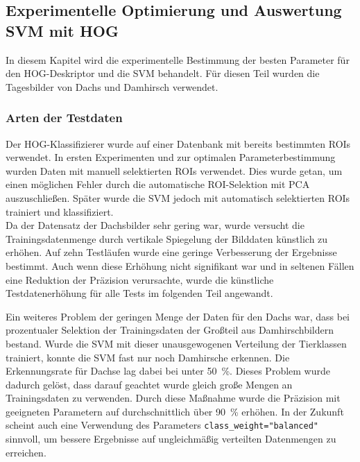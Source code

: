 \subsection{Experimentelle Optimierung und Auswertung SVM mit HOG} \label{sec:HOG_parameter_and_results}
In diesem Kapitel wird die experimentelle Bestimmung der besten Parameter für den HOG-Deskriptor und die SVM behandelt. Für diesen Teil wurden die Tagesbilder von Dachs und Damhirsch verwendet.


\subsubsection{Arten der Testdaten} \label{sssec:test_data_HOG}
Der HOG-Klassifizierer wurde auf einer Datenbank mit bereits bestimmten ROIs verwendet. In ersten Experimenten und zur optimalen Parameterbestimmung wurden Daten mit manuell selektierten ROIs verwendet. Dies wurde getan, um einen möglichen Fehler durch die automatische ROI-Selektion mit PCA auszuschließen. Später wurde die SVM jedoch mit automatisch selektierten ROIs trainiert und klassifiziert.\\ 
Da der Datensatz der Dachsbilder sehr gering war, wurde versucht die Trainingsdatenmenge durch vertikale Spiegelung der Bilddaten künstlich zu erhöhen. Auf zehn Testläufen wurde eine geringe Verbesserung der Ergebnisse bestimmt. Auch wenn diese Erhöhung nicht signifikant war und in seltenen Fällen eine Reduktion der Präzision verursachte, wurde die künstliche Testdatenerhöhung für alle Tests im folgenden Teil angewandt. 

Ein weiteres Problem der geringen Menge der Daten für den Dachs war, dass bei prozentualer Selektion der Trainingsdaten der Großteil aus Damhirschbildern bestand. Wurde die SVM mit dieser unausgewogenen Verteilung der Tierklassen trainiert, konnte die SVM fast nur noch Damhirsche erkennen. Die Erkennungsrate für Dachse lag dabei bei unter 50~\%. Dieses Problem wurde dadurch gelöst, dass darauf geachtet wurde gleich große Mengen an Trainingsdaten zu verwenden. Durch diese Maßnahme wurde die Präzision mit geeigneten Parametern auf durchschnittlich über 90~\% erhöhen. In der Zukunft scheint auch eine Verwendung des Parameters \texttt{class\_weight="balanced"} sinnvoll, um bessere Ergebnisse auf ungleichmäßig verteilten Datenmengen zu erreichen.

